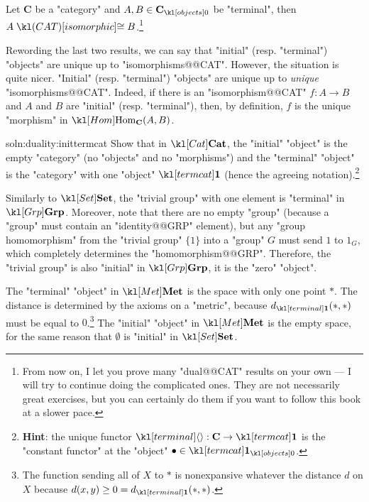\documentclass[main.tex]{subfiles}
\begin{document}
\begin{cor}\label{cor:terminalunique}
	Let $\mathbf{C}$ be a "category" and $A,B\in \obj{\mathbf{C}}$ be "terminal", then $A \isoCAT B$.\footnote{From now on, I let you prove many "dual@@CAT" results on your own --- I will try to continue doing the complicated ones. They are not necessarily great exercises, but you can certainly do them if you want to follow this book at a slower pace.}
\end{cor}
Rewording the last two results, we can say that "initial" (resp. "terminal") "objects" are unique up to "isomorphisms@@CAT". However, the situation is quite nicer. "Initial" (resp. "terminal") "objects" are unique up to  \textit{unique} "isomorphisms@@CAT". Indeed, if there is an "isomorphism@@CAT" $f: A \rightarrow B$ and $A$ and $B$ are "initial" (resp. "terminal"), then, by definition, $f$ is the unique "morphism" in $\Hom_{\mathbf{C}}(A,B)$. %
\begin{exer}{soln:duality:inittermcat}\label{exer:duality:inittermcat}
	Show that in $\catCat$, the "initial" "object" is the empty "category" (no "objects" and no "morphisms") and the "terminal" "object" is the "category" with one "object" $\termcat$ (hence the agreeing notation).\footnote{\textbf{Hint}: the unique functor $\termmorph:\mathbf{C} \rightarrow \termcat$ is the "constant functor" at the "object" $\bullet \in \obj{\termcat}$.}
\end{exer}
\begin{exmp}[$\catGrp$]
	Similarly to $\catSet$, the "trivial group" with one element is "terminal" in $\catGrp$. Moreover, note that there are no empty "group" (because a "group" must contain an "identity@@GRP" element), but any "group homomorphism" from the "trivial group" $\{1\}$ into a "group" $G$ must send $1$ to $1_G$, which completely determines the "homomorphism@@GRP". Therefore, the "trivial group" is also "initial" in $\catGrp$, it is the "zero" "object".
\end{exmp}
\begin{exmp}[$\catMet$]\label{exmp:terminitmet}
	The "terminal" "object" in $\catMet$ is the space with only one point $\ast$. The distance is determined by the axioms on a "metric", because $d_{\terminal}(\ast,\ast)$ must be equal to $0$.\footnote{The function sending all of $X$ to $\ast$ is nonexpansive whatever the distance $d$ on $X$ because $d(x,y) \geq 0 = d_{\terminal}(\ast,\ast)$.} The "initial" "object" in $\catMet$ is the empty space, for the same reason that $\emptyset$ is "initial" in $\catSet$.
\end{exmp}
\end{document}
